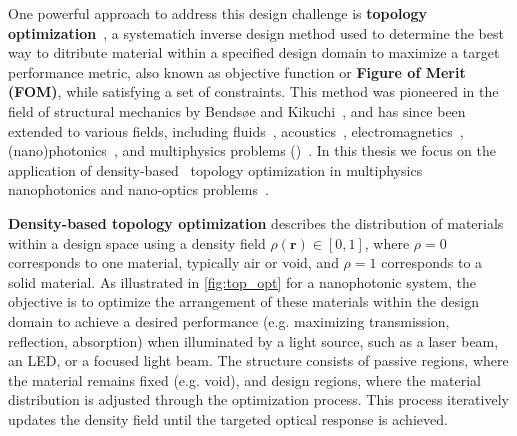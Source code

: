 One powerful approach to address this design challenge is \textbf{topology optimization}~\cite{topopt_book}, a systematich inverse design method used to determine the best way to ditribute 
material within a specified design domain to maximize a target performance metric, also known as 
objective function or \textbf{Figure of Merit (FOM)}, while satisfying a set of constraints. This method
was pioneered in the field of structural mechanics by Bendsøe and Kikuchi~\cite{bendsoe_kikukchi}, 
and has since been extended to various fields, including fluids~\cite{topopt_fluid}, acoustics~\cite{topopt_acoustic}, 
electromagnetics~\cite{topopt_EM}, (nano)photonics~\cite{topopt_phot}, and multiphysics problems ()~\cite{coupled_topopt}. In this thesis we focus on the application of density-based~\cite{bendsoe_density, topopt_approaches} 
topology optimization in multiphysics nanophotonics and nano-optics problems~\cite{jensen_review}.

\textbf{Density-based topology optimization} describes the distribution of materials within a design space using a 
density field $\rho(\mathbf{r}) \in [0,1]$, where $\rho = 0$ corresponds to one material, typically air or void, and $\rho = 1$ corresponds to a solid material.
 As illustrated 
in \autoref{fig:top_opt} for a nanophotonic system, the objective is to optimize the arrangement of these materials within 
the design domain to achieve a desired performance (e.g. maximizing transmission, reflection, absorption) when illuminated by a light source, such as a laser beam, an LED, or a focused light beam. 
The structure consists of passive regions, where the material remains fixed (e.g. void), and design regions, where the material distribution 
is adjusted through the optimization process. This process iteratively updates the density field until the targeted optical response is achieved.

